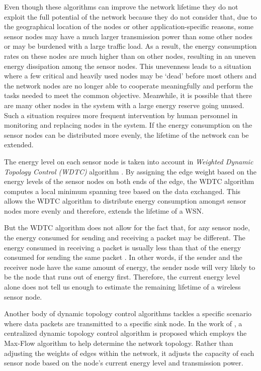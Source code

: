 \documentclass[journal,12pt,onecolumn]{IEEEtran}
\begin{document}
Even though these algorithms can improve the network lifetime they do
not exploit the full potential of the network because they do not
consider that, due to the geographical location of the nodes or other
application-specific reasons, some sensor nodes may have a much larger
transmission power than some other nodes or may be burdened with a
large traffic load. As a result, the energy consumption rates on these
nodes are much higher than on other nodes, resulting in an uneven
energy dissipation among the sensor nodes. This unevenness leads to a
situation where a few critical and heavily used nodes may be `dead'
before most others and the network nodes are no longer able to
cooperate meaningfully and perform the tasks needed to meet the common
objective. Meanwhile, it is possible that there are many other nodes
in the system with a large energy reserve going unused. Such a
situation requires more frequent intervention by human personnel in
monitoring and replacing nodes in the system. If the energy
consumption on the sensor nodes can be distributed more evenly, the
lifetime of the network can be extended.


The energy level on each sensor node is taken into account in \emph{Weighted
Dynamic Topology Control (WDTC)} algorithm \cite{SunYua2011}. By
assigning the edge weight based on the energy levels of the sensor
nodes on both ends of the edge, the WDTC algorithm computes a local minimum 
spanning tree based on the data exchanged. This allows the WDTC algorithm to
distribute energy consumption amongst sensor nodes more evenly and
therefore, extends the lifetime of a WSN. 

But the WDTC algorithm does not
allow for the fact that, for any sensor node, the energy consumed for
sending and receiving a packet may be different. The energy
consumed in receiving a packet is usually less than that of the
energy consumed for sending the same packet
\cite{HeiCha2000,TiaGeo2003,MilVai2004,KolPav2011}. In other words, if
the sender and the receiver node have the same amount of energy, the
sender node will very likely to be the node that runs out of energy
first. 
Therefore, the current energy level alone does not tell us enough to
estimate the remaining lifetime of a wireless sensor node.



Another body of dynamic topology control algorithms tackles a
specific scenario where data packets are transmitted to a specific
sink node. In the work of \cite{ShiSon2011}, a centralized dynamic
topology control algorithm is proposed which employs the Max-Flow
algorithm to help determine the network topology. Rather than adjusting the weights of edges within the
network, it adjusts the capacity of each sensor node based on the
node's current energy level and transmission power.
\end{document}
